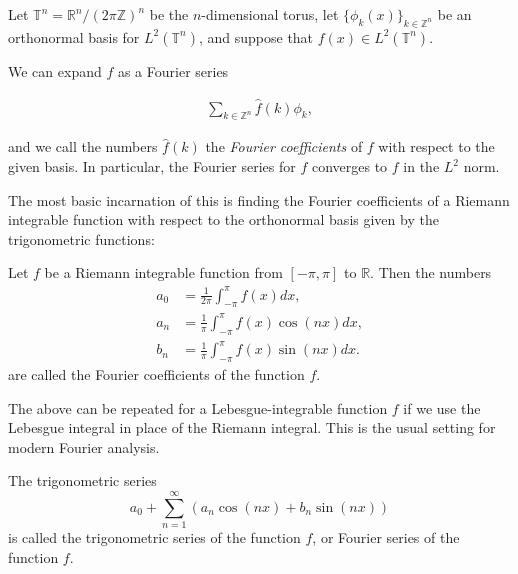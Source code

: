 \documentclass[12pt]{article}
\begin{document}
Let $\mathbb{T}^n=\mathbb{R}^n/(2\pi\mathbb{Z})^n$ be the $n$-dimensional torus, let $\{\phi_k(x)\}_{k\in\mathbb{Z}^n}$ be an orthonormal basis for $L^2(\mathbb{T}^n)$, and suppose that $f(x)\in L^2(\mathbb{T}^n)$.

We can expand $f$ as a Fourier series

\begin{align*}
\sum_{k\in\mathbb{Z}^n}\hat{f}(k)\phi_k,
\end{align*}

and we call the numbers $\hat{f}(k)$ the \emph{Fourier coefficients} of $f$ with respect to the given basis.  In particular, the Fourier series for $f$ converges to $f$ in the $L^2$ norm.

The most basic incarnation of this is finding the Fourier coefficients of a Riemann integrable function with respect to the orthonormal basis given by the trigonometric functions:

Let $f$ be a Riemann integrable function from $[-\pi,\pi]$ to $\mathbb{R}$. Then the numbers
\begin{align*}
a_0 &= \frac{1}{2\pi}\int_{-\pi}^{\pi}f(x)dx,\\
a_n &= \frac{1}{\pi}\int_{-\pi}^{\pi}f(x)\cos(nx)dx,\\
b_n &= \frac{1}{\pi}\int_{-\pi}^{\pi}f(x)\sin(nx)dx.
\end{align*}
are called the Fourier coefficients of the function $f.$

The above can be repeated for a Lebesgue-integrable function $f$ if we use the Lebesgue integral in place of the Riemann integral.  This is the usual setting for modern Fourier analysis.

The trigonometric series 
$$ a_0 + \sum_{n=1}^{\infty}(a_n\cos(nx)+b_n\sin(nx))$$ is called the trigonometric series of the function $f$, or Fourier series of the function $f.$
\end{document}
